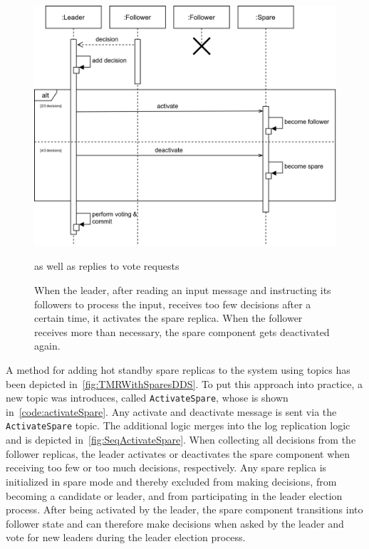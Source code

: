 \begin{figure}[!hb]
	\centering
	\includegraphics[width=0.75\linewidth]{images/sequence/ActivateSpare}
	\caption{When the leader, after reading an input message and instructing its followers to process the input, receives too few decisions after a certain time, it activates the spare replica. When the follower receives more than necessary, the spare component gets deactivated again.} as well as replies to vote requests
	\label{fig:SeqActivateSpare}
\end{figure}

A method for adding hot standby spare replicas to the system using  topics has been depicted in~\autoref{fig:TMRWithSparesDDS}.
To put this approach into practice, a new topic was introduces, called \texttt{ActivateSpare}, whose  is shown in~\autoref{code:activateSpare}.
Any activate and deactivate message is sent via the \texttt{ActivateSpare} topic.
The additional logic merges into the log replication logic and is depicted in~\autoref{fig:SeqActivateSpare}.
When collecting all decisions from the follower replicas, the leader activates or deactivates the spare component when receiving too few or too much decisions, respectively.
Any spare replica is initialized in spare mode and thereby excluded from making decisions, from becoming a candidate or leader, and from participating in the leader election process.
After being activated by the leader, the spare component transitions into follower state and can therefore make decisions when asked by the leader and vote for new leaders during the leader election process.

